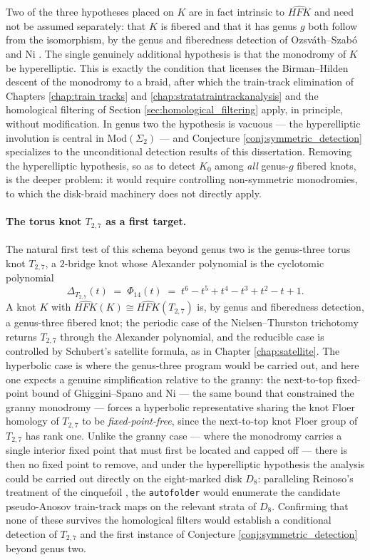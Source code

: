 Two of the three hypotheses placed on $K$ are in fact intrinsic to $\widehat{HFK}$ and need not be assumed separately: that $K$ is fibered and that it has genus $g$ both follow from the isomorphism, by the genus and fiberedness detection of Ozsv\'ath--Szab\'o and Ni \cite{Ni07}. The single genuinely additional hypothesis is that the monodromy of $K$ be hyperelliptic. This is exactly the condition that licenses the Birman--Hilden descent of the monodromy to a braid, after which the train-track elimination of Chapters \ref{chap:train tracks} and \ref{chap:stratatraintrackanalysis} and the homological filtering of Section \ref{sec:homological_filtering} apply, in principle, without modification. In genus two the hypothesis is vacuous --- the hyperelliptic involution is central in $\mathrm{Mod}(\Sigma_2)$ --- and Conjecture \ref{conj:symmetric_detection} specializes to the unconditional detection results of this dissertation. Removing the hyperelliptic hypothesis, so as to detect $K_0$ among \emph{all} genus-$g$ fibered knots, is the deeper problem: it would require controlling non-symmetric monodromies, to which the disk-braid machinery does not directly apply.

\paragraph{The torus knot $T_{2,7}$ as a first target.}
The natural first test of this schema beyond genus two is the genus-three torus knot $T_{2,7}$, a $2$-bridge knot whose Alexander polynomial is the cyclotomic polynomial
\[
\Delta_{T_{2,7}}(t) \;=\; \Phi_{14}(t) \;=\; t^6 - t^5 + t^4 - t^3 + t^2 - t + 1.
\]
A knot $K$ with $\widehat{HFK}(K) \cong \widehat{HFK}(T_{2,7})$ is, by genus and fiberedness detection, a genus-three fibered knot; the periodic case of the Nielsen--Thurston trichotomy returns $T_{2,7}$ through the Alexander polynomial, and the reducible case is controlled by Schubert's satellite formula, as in Chapter \ref{chap:satellite}. The hyperbolic case is where the genus-three program would be carried out, and here one expects a genuine simplification relative to the granny: the next-to-top fixed-point bound of Ghiggini--Spano and Ni \cite{ghiggini2022heegaard, Ni2022} --- the same bound that constrained the granny monodromy --- forces a hyperbolic representative sharing the knot Floer homology of $T_{2,7}$ to be \emph{fixed-point-free}, since the next-to-top knot Floer group of $T_{2,7}$ has rank one. Unlike the granny case --- where the monodromy carries a single interior fixed point that must first be located and capped off --- there is then no fixed point to remove, and under the hyperelliptic hypothesis the analysis could be carried out directly on the eight-marked disk $D_8$: paralleling Reinoso's treatment of the cinquefoil \cite{Reinoso2023}, the \texttt{autofolder} would enumerate the candidate pseudo-Anosov train-track maps on the relevant strata of $D_8$. Confirming that none of these survives the homological filters  would establish a conditional detection of $T_{2,7}$ and the first instance of Conjecture \ref{conj:symmetric_detection} beyond genus two.

